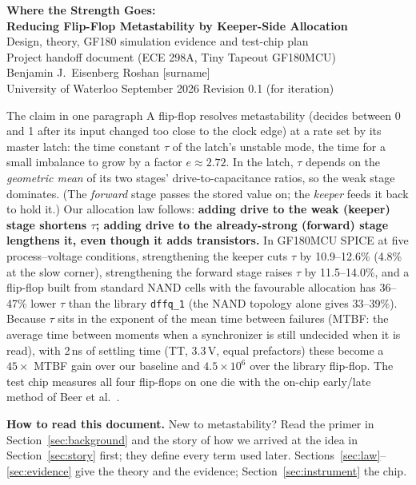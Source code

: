 \documentclass[11pt]{article}
\begin{document}
\begin{center}
{\LARGE\bfseries Where the Strength Goes:\\[3pt] Reducing Flip-Flop Metastability by Keeper-Side Allocation}\\[8pt]
{\large Design, theory, GF180 simulation evidence and test-chip plan}\\[4pt]
{\large Project handoff document (ECE 298A, Tiny Tapeout GF180MCU)}\\[10pt]
Benjamin J.\ Eisenberg \quad Roshan [surname]\\[2pt]
University of Waterloo  September 2026 \quad Revision 0.1 (for iteration)
\end{center}

\begin{keybox}{The claim in one paragraph}
A flip-flop resolves metastability (decides between 0 and 1 after its input changed too close to the clock edge)
at a rate set by its master latch: the time constant $\tau$ of the latch's unstable mode, the time for a small
imbalance to grow by a factor $e\approx2.72$. In the latch, $\tau$ depends on the \emph{geometric mean} of its two stages' drive-to-capacitance ratios, so the weak
stage dominates. (The \emph{forward} stage passes the stored value on; the \emph{keeper} feeds it back to hold it.)
Our allocation law follows: \textbf{adding drive to the weak (keeper) stage shortens $\tau$;
adding drive to the already-strong (forward) stage lengthens it, even though it adds transistors.} In GF180MCU
SPICE at five process--voltage conditions, strengthening the keeper cuts $\tau$ by 10.9--12.6\% (4.8\% at the
slow corner), strengthening the forward stage raises $\tau$ by 11.5--14.0\%, and a flip-flop built from standard
NAND cells with the favourable allocation has 36--47\% lower $\tau$ than the library \texttt{dffq\_1} (the NAND topology alone gives 33--39\%). Because
$\tau$ sits in the exponent of the mean time between failures (MTBF: the average time between moments when a
synchronizer is still undecided when it is read), with 2\,ns of settling time (TT, 3.3\,V, equal prefactors) these become a
$45\times$ MTBF gain over our baseline and $4.5\times10^{6}$ over the library flip-flop. The test chip measures
all four flip-flops on one die with the on-chip early/late method of Beer et al.\ \cite{beer2011}.
\end{keybox}

\noindent\textbf{How to read this document.} New to metastability? Read the primer in Section~\ref{sec:background}
and the story of how we arrived at the idea in Section~\ref{sec:story} first; they define every term used later.
Sections~\ref{sec:law}--\ref{sec:evidence} give the theory and the evidence; Section~\ref{sec:instrument} the chip.
\end{document}
